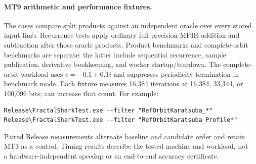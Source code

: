 \paragraph{MT9 arithmetic and performance fixtures.}
The  cases compare split products against an
independent  oracle over every stored input limb. Recurrence
tests apply ordinary full-precision MPIR addition and subtraction after those
oracle products. Product benchmarks and complete-orbit benchmarks are separate:
the latter include sequential recurrence, sample publication, derivative
bookkeeping, and worker startup/teardown. The complete-orbit workload uses
$c=-0.1+0.1i$ and suppresses periodicity termination in benchmark mode.
Each fixture measures 16,384 iterations at 16,384, 33,344, or 100,096 bits;
 can increase that count.
For example:
\begin{lstlisting}[language={}]
Release\FractalSharkTest.exe --filter "RefOrbitKaratsuba_*"
Release\FractalSharkTest.exe --filter "RefOrbitKaratsuba_Profile*"
\end{lstlisting}
Paired Release measurements alternate baseline and candidate order and retain
MT3 as a control. Timing results describe the tested machine and workload,
not a hardware-independent speedup or an end-to-end accuracy certificate.

